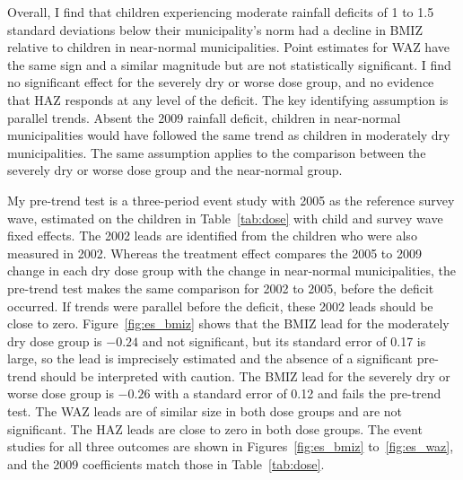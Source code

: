 \documentclass[12pt]{article}
\begin{document}
Overall, I find that children experiencing moderate rainfall deficits of 1 to 1.5 standard deviations below their municipality's norm had a decline in BMIZ relative to children in near-normal municipalities. Point estimates for WAZ have the same sign and a similar magnitude but are not statistically significant. I find no significant effect for the severely dry or worse dose group, and no evidence that HAZ responds at any level of the deficit. The key identifying assumption is parallel trends. Absent the 2009 rainfall deficit, children in near-normal municipalities would have followed the same trend as children in moderately dry municipalities. The same assumption applies to the comparison between the severely dry or worse dose group and the near-normal group.

My pre-trend test is a three-period event study with 2005 as the reference survey wave, estimated on the children in Table~\ref{tab:dose} with child and survey wave fixed effects. The 2002 leads are identified from the children who were also measured in 2002. Whereas the treatment effect compares the 2005 to 2009 change in each dry dose group with the change in near-normal municipalities, the pre-trend test makes the same comparison for 2002 to 2005, before the deficit occurred. If trends were parallel before the deficit, these 2002 leads should be close to zero. Figure~\ref{fig:es_bmiz} shows that the BMIZ lead for the moderately dry dose group is $-0.24$ and not significant, but its standard error of 0.17 is large, so the lead is imprecisely estimated and the absence of a significant pre-trend should be interpreted with caution. The BMIZ lead for the severely dry or worse dose group is $-0.26$ with a standard error of 0.12 and fails the pre-trend test. The WAZ leads are of similar size in both dose groups and are not significant. The HAZ leads are close to zero in both dose groups. The event studies for all three outcomes are shown in Figures~\ref{fig:es_bmiz} to~\ref{fig:es_waz}, and the 2009 coefficients match those in Table~\ref{tab:dose}.
\end{document}
